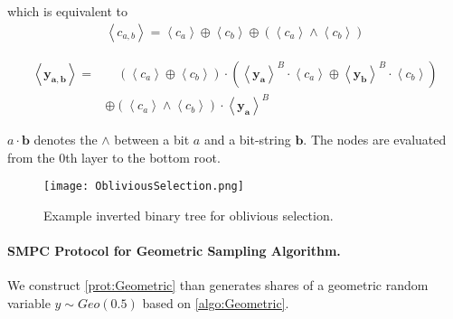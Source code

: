 which is equivalent to
\begin{equation}
    \begin{split}
        \left\langle c_{a,b}\right\rangle=\left\langle c_{a}\right\rangle\oplus \left\langle c_{b}\right\rangle \oplus \left(\left\langle c_{a}\right\rangle \land\left\langle c_{b}\right\rangle\right)
    \end{split}
\end{equation}

\begin{equation}
    \begin{split}
        \left\langle \boldsymbol{y_{a,b}}\right\rangle=& \quad \left(\left\langle c_{a}\right\rangle\oplus \left\langle c_{b}\right\rangle\right) \cdot \left(\left\langle \boldsymbol{y_{a}}\right\rangle ^{B}\cdot \left\langle c_{a}\right\rangle \oplus  \left\langle \boldsymbol{y_{b}}\right\rangle ^{B} \cdot \left\langle c_{b}\right\rangle \right)  \\
        & \oplus \left(\left\langle c_{a}\right\rangle \land\left\langle c_{b}\right\rangle\right) \cdot \left\langle \boldsymbol{y_{a}}\right\rangle ^{B}
    \end{split}
\end{equation}

$a \cdot \boldsymbol{b}$ denotes the $\land$ between a bit $a$ and a bit-string $\boldsymbol{b}$. The nodes are evaluated from the $0$th layer to the bottom root.


\begin{figure}[htbp]
    \texttt{[image: ObliviousSelection.png]}
    \centering
    \caption{Example inverted binary tree for oblivious selection.}
    \label{img:ObliviousSelection}
\end{figure}
\FloatBarrier


\paragraph{SMPC Protocol for Geometric Sampling Algorithm.}
\label{para:GeometricDistribution}
We construct \autoref{prot:Geometric} than generates shares of a geometric random variable $y\sim Geo\left(0.5\right) $ based on \autoref{algo:Geometric}.


